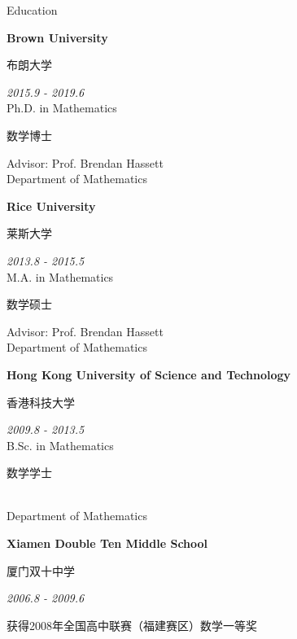 \documentclass{resume} %
\begin{document}

\begin{rSection}{Education}

{\bf Brown University \begin{CJK}{UTF8}{gbsn}布朗大学\end{CJK}} \hfill {\em 2015.9 - 2019.6} \\ 
Ph.D. in Mathematics \begin{CJK}{UTF8}{gbsn}数学博士\end{CJK} \hfill {Advisor: Prof. Brendan Hassett}\\
Department of Mathematics \\

{\bf Rice University \begin{CJK}{UTF8}{gbsn}莱斯大学\end{CJK}} \hfill {\em 2013.8 - 2015.5} \\ 
M.A. in Mathematics \begin{CJK}{UTF8}{gbsn}数学硕士\end{CJK} \hfill {Advisor: Prof. Brendan Hassett}\\
Department of Mathematics \\

{\bf Hong Kong University of Science and Technology \begin{CJK}{UTF8}{gbsn}香港科技大学\end{CJK}} \hfill {\em 2009.8 - 2013.5} \\ 
B.Sc. in Mathematics \begin{CJK}{UTF8}{gbsn}数学学士\end{CJK}\\
Department of Mathematics \\

{\bf Xiamen Double Ten Middle School \begin{CJK}{UTF8}{gbsn}厦门双十中学\end{CJK}} \hfill {\em 2006.8 - 2009.6} \\ 
\begin{CJK}{UTF8}{gkai}获得2008年全国高中联赛（福建赛区）数学一等奖\end{CJK}

\end{rSection}

\end{document}
